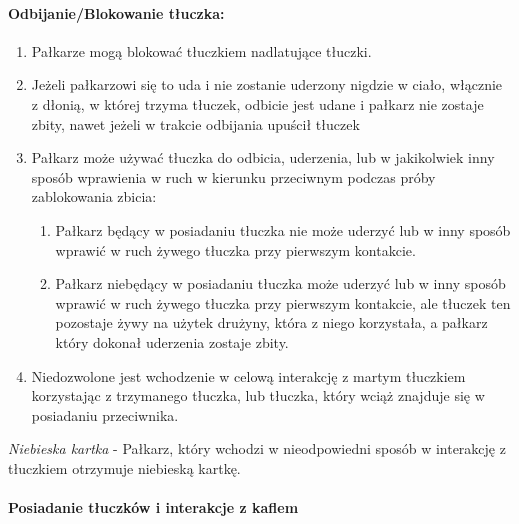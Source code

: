 \documentclass[12pt]{article}
\begin{document}
\paragraph{Odbijanie/Blokowanie tłuczka:}

\begin{enumerate}
\item
    Pałkarze mogą blokować tłuczkiem nadlatujące tłuczki.
  \item
    Jeżeli pałkarzowi się to uda i nie zostanie uderzony nigdzie w ciało,
  włącznie z dłonią, w której trzyma tłuczek, odbicie jest udane i
  pałkarz nie zostaje zbity, nawet jeżeli w trakcie odbijania upuścił
  tłuczek
  \item
    Pałkarz może używać tłuczka do odbicia, uderzenia, lub w jakikolwiek
  inny sposób wprawienia w ruch w kierunku przeciwnym podczas próby
  zablokowania zbicia:
  
  \begin{enumerate}
  \item
        Pałkarz będący w posiadaniu tłuczka nie może uderzyć lub w inny
    sposób wprawić w ruch żywego tłuczka przy pierwszym kontakcie.
      \item
        Pałkarz niebędący w posiadaniu tłuczka może uderzyć lub w inny
    sposób wprawić w ruch żywego tłuczka przy pierwszym kontakcie, ale
    tłuczek ten pozostaje żywy na użytek drużyny, która z niego
    korzystała, a pałkarz który dokonał uderzenia zostaje zbity.
      \end{enumerate}
\item
    Niedozwolone jest wchodzenie w celową interakcję z martym tłuczkiem
  korzystając z trzymanego tłuczka, lub tłuczka, który wciąż znajduje
  się w posiadaniu przeciwnika.
  \end{enumerate}

\emph{Niebieska kartka} - Pałkarz, który wchodzi w nieodpowiedni sposób
w interakcję z tłuczkiem otrzymuje niebieską kartkę.

\paragraph{Posiadanie tłuczków i interakcje z kaflem}
\end{document}

